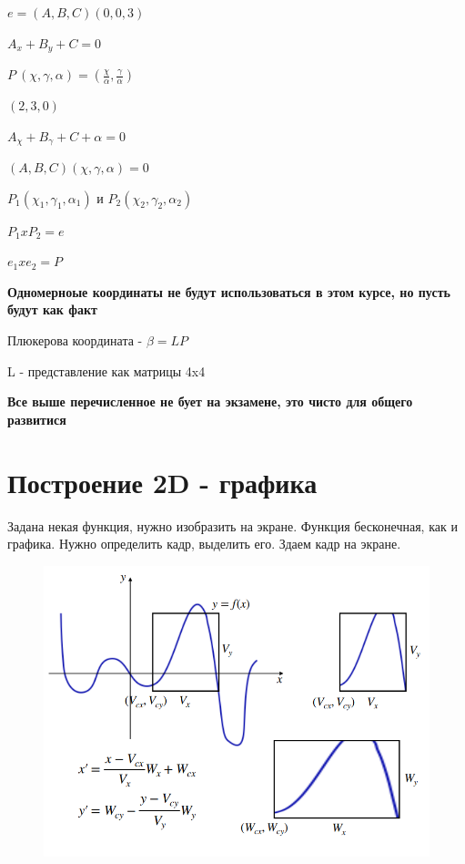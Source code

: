 \documentclass{article}
\begin{document}
$e = (A,B,C) (0,0,3)$

$A_x+B_y+C=0$

$P ~ (\chi,\gamma, \alpha) = (\frac{\chi}{\alpha}, \frac{\gamma}{\alpha})$

$(2,3,0)$

\vspace{3mm}

$A_\chi + B_\gamma + C+\alpha = 0$

$(A,B,C) (\chi,\gamma,\alpha) = 0$

$P_1(\chi_1,\gamma_1,\alpha_1)$ и $P_2(\chi_2,\gamma_2,\alpha_2) $

\vspace{3mm}

$P_1 x P_2 = e$

$e_1 x e_2 = P$

\textbf{Одномерноые координаты не будут использоваться в этом курсе, но пусть будут как факт}


Плюкерова координата - $\beta=LP$

L - представление как матрицы 4x4

\textbf{Все выше перечисленное не бует на экзамене, это чисто для общего развитися}

\section{Построение 2D - графика}

Задана некая функция, нужно изобразить на экране.
Функция бесконечная, как и графика.
Нужно определить кадр, выделить его.
Здаем кадр на экране.


\begin{figure} [H]
    \includegraphics[width=0.70\linewidth]{Снимок экрана 2025-03-17 123016.png}
\end{figure}
\end{document}
